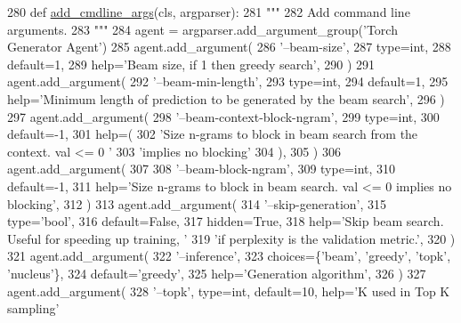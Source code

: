 \begin{DoxyCode}
280     \textcolor{keyword}{def }\hyperlink{namespaceparlai_1_1agents_1_1drqa_1_1config_a62fdd5554f1da6be0cba185271058320}{add\_cmdline\_args}(cls, argparser):
281         \textcolor{stringliteral}{"""}
282 \textcolor{stringliteral}{        Add command line arguments.}
283 \textcolor{stringliteral}{        """}
284         agent = argparser.add\_argument\_group(\textcolor{stringliteral}{'Torch Generator Agent'})
285         agent.add\_argument(
286             \textcolor{stringliteral}{'--beam-size'},
287             type=int,
288             default=1,
289             help=\textcolor{stringliteral}{'Beam size, if 1 then greedy search'},
290         )
291         agent.add\_argument(
292             \textcolor{stringliteral}{'--beam-min-length'},
293             type=int,
294             default=1,
295             help=\textcolor{stringliteral}{'Minimum length of prediction to be generated by the beam search'},
296         )
297         agent.add\_argument(
298             \textcolor{stringliteral}{'--beam-context-block-ngram'},
299             type=int,
300             default=-1,
301             help=(
302                 \textcolor{stringliteral}{'Size n-grams to block in beam search from the context. val <= 0 '}
303                 \textcolor{stringliteral}{'implies no blocking'}
304             ),
305         )
306         agent.add\_argument(
307 
308             \textcolor{stringliteral}{'--beam-block-ngram'},
309             type=int,
310             default=-1,
311             help=\textcolor{stringliteral}{'Size n-grams to block in beam search. val <= 0 implies no blocking'},
312         )
313         agent.add\_argument(
314             \textcolor{stringliteral}{'--skip-generation'},
315             type=\textcolor{stringliteral}{'bool'},
316             default=\textcolor{keyword}{False},
317             hidden=\textcolor{keyword}{True},
318             help=\textcolor{stringliteral}{'Skip beam search. Useful for speeding up training, '}
319             \textcolor{stringliteral}{'if perplexity is the validation metric.'},
320         )
321         agent.add\_argument(
322             \textcolor{stringliteral}{'--inference'},
323             choices=\{\textcolor{stringliteral}{'beam'}, \textcolor{stringliteral}{'greedy'}, \textcolor{stringliteral}{'topk'}, \textcolor{stringliteral}{'nucleus'}\},
324             default=\textcolor{stringliteral}{'greedy'},
325             help=\textcolor{stringliteral}{'Generation algorithm'},
326         )
327         agent.add\_argument(
328             \textcolor{stringliteral}{'--topk'}, type=int, default=10, help=\textcolor{stringliteral}{'K used in Top K sampling'}

\end{DoxyCode}
